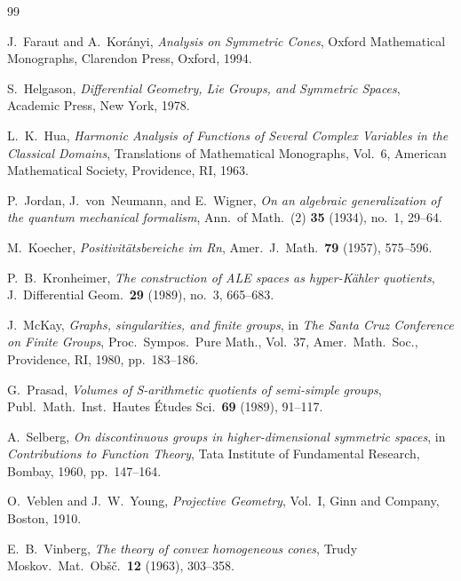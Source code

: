 \documentclass[11pt,reqno]{amsart}
\theoremstyle{definition}
\theoremstyle{remark}
\begin{document}
\begin{thebibliography}{99}

J.~Faraut and A.~Kor\'anyi, \emph{Analysis on Symmetric Cones}, Oxford Mathematical Monographs, Clarendon Press, Oxford, 1994.

S.~Helgason, \emph{Differential Geometry, Lie Groups, and Symmetric Spaces}, Academic Press, New York, 1978.

L.~K.~Hua, \emph{Harmonic Analysis of Functions of Several Complex Variables in the Classical Domains}, Translations of Mathematical Monographs, Vol.~6, American Mathematical Society, Providence, RI, 1963.

P.~Jordan, J.~von~Neumann, and E.~Wigner, \emph{On an algebraic generalization of the quantum mechanical formalism}, Ann.\ of Math.\ (2) \textbf{35} (1934), no.~1, 29--64.

M.~Koecher, \emph{Positivit\"atsbereiche im Rn}, Amer.\ J.\ Math.\ \textbf{79} (1957), 575--596.

P.~B.~Kronheimer, \emph{The construction of ALE spaces as hyper-K\"ahler quotients}, J.\ Differential Geom.\ \textbf{29} (1989), no.~3, 665--683.

J.~McKay, \emph{Graphs, singularities, and finite groups}, in \emph{The Santa Cruz Conference on Finite Groups}, Proc.\ Sympos.\ Pure Math., Vol.~37, Amer.\ Math.\ Soc., Providence, RI, 1980, pp.~183--186.

G.~Prasad, \emph{Volumes of S-arithmetic quotients of semi-simple groups}, Publ.\ Math.\ Inst.\ Hautes \'Etudes Sci.\ \textbf{69} (1989), 91--117.

A.~Selberg, \emph{On discontinuous groups in higher-dimensional symmetric spaces}, in \emph{Contributions to Function Theory}, Tata Institute of Fundamental Research, Bombay, 1960, pp.~147--164.

O.~Veblen and J.~W.~Young, \emph{Projective Geometry}, Vol.~I, Ginn and Company, Boston, 1910.

E.~B.~Vinberg, \emph{The theory of convex homogeneous cones}, Trudy Moskov.\ Mat.\ Ob\v{s}\v{c}.\ \textbf{12} (1963), 303--358.

\end{thebibliography}
\end{document}
